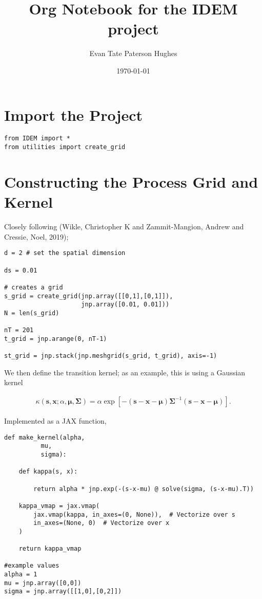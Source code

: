 \documentclass[letterpaper]{article}
\author{Evan Tate Paterson Hughes}
\date{\today}
\title{Org Notebook for the IDEM project}
\newcommand*{\mat}[1]{\bm{#1}}
\renewcommand*{\vec}[1]{\boldsymbol{\mathbf{#1}}}
\begin{document}
\maketitle

\section{Import the Project}
\label{sec:org5c5669b}

\begin{verbatim}
from IDEM import *
from utilities import create_grid
\end{verbatim}
\section{Constructing the Process Grid and Kernel}
\label{sec:org7509ec5}

Closely following (Wikle, Christopher K and Zammit-Mangion, Andrew and Cressie, Noel, 2019);

\begin{verbatim}
d = 2 # set the spatial dimension

ds = 0.01

# creates a grid 
s_grid = create_grid(jnp.array([[0,1],[0,1]]),
                     jnp.array([0.01, 0.01]))
N = len(s_grid)

nT = 201
t_grid = jnp.arange(0, nT-1)

st_grid = jnp.stack(jnp.meshgrid(s_grid, t_grid), axis=-1)
\end{verbatim}

We then define the transition kernel; as an example, this is using a Gaussian kernel

\begin{align*}
\kappa(\vec s, \vec x; \alpha, \vec\mu, \mat\Sigma) = \alpha\exp \left[ -(\vec s - \vec x - \vec \mu) \mat\Sigma^{-1} (\vec s - \vec x - \vec \mu) \right].
\end{align*}

Implemented as a JAX function,

\begin{verbatim}
def make_kernel(alpha,
          mu,
          sigma):

    def kappa(s, x): 
        
        return alpha * jnp.exp(-(s-x-mu) @ solve(sigma, (s-x-mu).T))

    kappa_vmap = jax.vmap(
        jax.vmap(kappa, in_axes=(0, None)),  # Vectorize over s
        in_axes=(None, 0)  # Vectorize over x
    )

    return kappa_vmap

#example values
alpha = 1
mu = jnp.array([0,0])
sigma = jnp.array([[1,0],[0,2]])
\end{verbatim}
\end{document}
